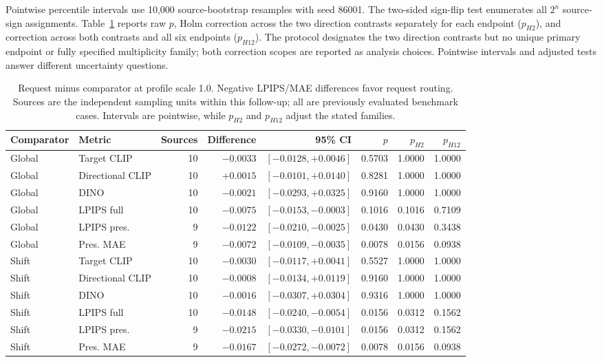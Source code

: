 Pointwise percentile intervals use 10,000 source-bootstrap resamples with seed 86001. The two-sided sign-flip test enumerates all $2^n$ source-sign assignments. Table~\ref{tab:r86-primary} reports raw $p$, Holm correction across the two direction contrasts separately for each endpoint ($p_{H2}$), and correction across both contrasts and all six endpoints ($p_{H12}$). The protocol designates the two direction contrasts but no unique primary endpoint or fully specified multiplicity family; both correction scopes are reported as analysis choices. Pointwise intervals and adjusted tests answer different uncertainty questions.

\begin{table}[t]
\centering\small
\caption{Request minus comparator at profile scale 1.0. Negative LPIPS/MAE differences favor request routing. Sources are the independent sampling units within this follow-up; all are previously evaluated benchmark cases. Intervals are pointwise, while $p_{H2}$ and $p_{H12}$ adjust the stated families.}
\label{tab:r86-primary}
\setlength{\tabcolsep}{5pt}
\begin{tabular}{llrrrrrr}
\toprule
Comparator & Metric & Sources & Difference & 95\% CI & $p$ & $p_{H2}$ & $p_{H12}$\\
\midrule
Global & Target CLIP & 10 & $-0.0033$ & $[-0.0128,+0.0046]$ & 0.5703 & 1.0000 & 1.0000\\
Global & Directional CLIP & 10 & $+0.0015$ & $[-0.0101,+0.0140]$ & 0.8281 & 1.0000 & 1.0000\\
Global & DINO & 10 & $-0.0021$ & $[-0.0293,+0.0325]$ & 0.9160 & 1.0000 & 1.0000\\
Global & LPIPS full & 10 & $-0.0075$ & $[-0.0153,-0.0003]$ & 0.1016 & 0.1016 & 0.7109\\
Global & LPIPS pres. & 9 & $-0.0122$ & $[-0.0210,-0.0025]$ & 0.0430 & 0.0430 & 0.3438\\
Global & Pres. MAE & 9 & $-0.0072$ & $[-0.0109,-0.0035]$ & 0.0078 & 0.0156 & 0.0938\\
Shift & Target CLIP & 10 & $-0.0030$ & $[-0.0117,+0.0041]$ & 0.5527 & 1.0000 & 1.0000\\
Shift & Directional CLIP & 10 & $-0.0008$ & $[-0.0134,+0.0119]$ & 0.9160 & 1.0000 & 1.0000\\
Shift & DINO & 10 & $-0.0016$ & $[-0.0307,+0.0304]$ & 0.9316 & 1.0000 & 1.0000\\
Shift & LPIPS full & 10 & $-0.0148$ & $[-0.0240,-0.0054]$ & 0.0156 & 0.0312 & 0.1562\\
Shift & LPIPS pres. & 9 & $-0.0215$ & $[-0.0330,-0.0101]$ & 0.0156 & 0.0312 & 0.1562\\
Shift & Pres. MAE & 9 & $-0.0167$ & $[-0.0272,-0.0072]$ & 0.0078 & 0.0156 & 0.0938\\
\bottomrule\end{tabular}\end{table}


